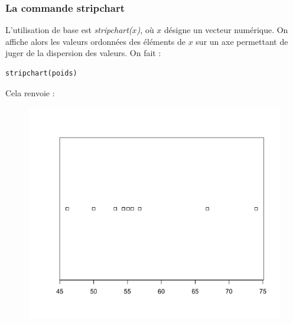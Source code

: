 \subsubsection{La commande stripchart}
L'utilisation de base est \textit{stripchart($x$)}, où $x$ désigne un vecteur numérique.\newline
On affiche alors les valeurs ordonnées des éléments de $x$ sur un axe permettant de juger de la dispersion des valeurs.\newline
On fait :
\begin{lstlisting}[language=html]
stripchart(poids)
\end{lstlisting}
Cela renvoie :
\begin{figure}[H]\begin{center}\includegraphics[scale=0.4]{ilu/gra5.png}\end{center}\end{figure}
